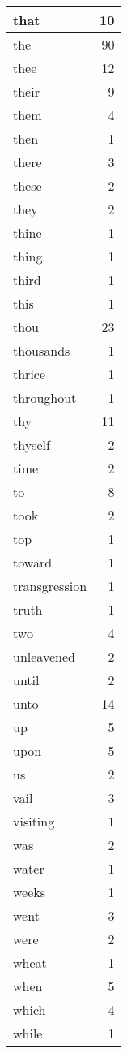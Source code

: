 \begin{center}
\begin{longtable}{l|r}
that & 10 \\ \hline
the & 90 \\ \hline
thee & 12 \\ \hline
their & 9 \\ \hline
them & 4 \\ \hline
then & 1 \\ \hline
there & 3 \\ \hline
these & 2 \\ \hline
they & 2 \\ \hline
thine & 1 \\ \hline
thing & 1 \\ \hline
third & 1 \\ \hline
this & 1 \\ \hline
thou & 23 \\ \hline
thousands & 1 \\ \hline
thrice & 1 \\ \hline
throughout & 1 \\ \hline
thy & 11 \\ \hline
thyself & 2 \\ \hline
time & 2 \\ \hline
to & 8 \\ \hline
took & 2 \\ \hline
top & 1 \\ \hline
toward & 1 \\ \hline
transgression & 1 \\ \hline
truth & 1 \\ \hline
two & 4 \\ \hline
unleavened & 2 \\ \hline
until & 2 \\ \hline
unto & 14 \\ \hline
up & 5 \\ \hline
upon & 5 \\ \hline
us & 2 \\ \hline
vail & 3 \\ \hline
visiting & 1 \\ \hline
was & 2 \\ \hline
water & 1 \\ \hline
weeks & 1 \\ \hline
went & 3 \\ \hline
were & 2 \\ \hline
wheat & 1 \\ \hline
when & 5 \\ \hline
which & 4 \\ \hline
while & 1 \\ \hline

\end{longtable}
\end{center}
